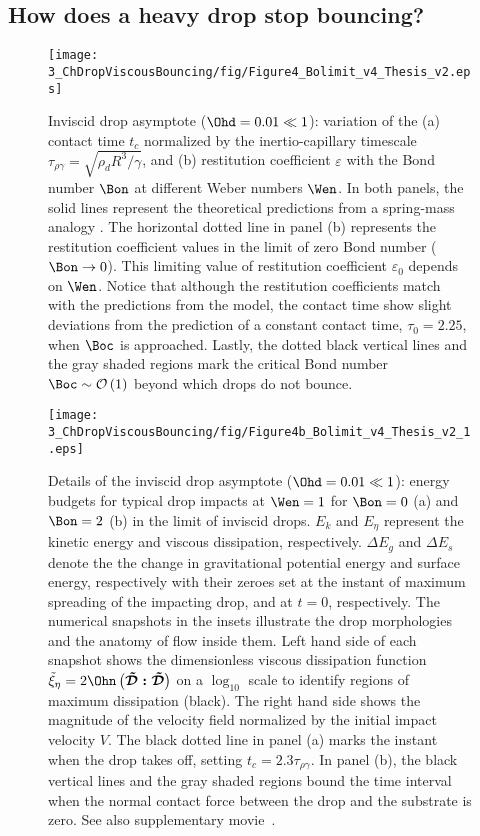 \subsection{How does a heavy drop stop bouncing?}\label{sec:LimitingCases:Bo}
\begin{figure}
	\centering
	\texttt{[image: 3\_ChDropViscousBouncing/fig/Figure4\_Bolimit\_v4\_Thesis\_v2.eps]}
	\caption{Inviscid drop asymptote ($\Ohd = 0.01 \ll 1$): variation of the (a) contact time $t_c$ normalized by the inertio-capillary timescale $\tau_{\rho\gamma} = \sqrt{\rho_dR^3/\gamma}$, and (b) restitution coefficient $\varepsilon$ with the Bond number $\Bon$ at different Weber numbers $\Wen$. In both panels, the solid lines represent the theoretical predictions from a spring-mass analogy \citep[equation~\ref{eqn:BianceEtAl_epsilon},][]{biance2006}. The horizontal dotted line in panel (b) represents the restitution coefficient values in the limit of zero Bond number ($\Bon \to 0$). This limiting value of restitution coefficient $\varepsilon_0$ depends on $\Wen$. Notice that although the restitution coefficients match with the predictions from the model, the contact time show slight deviations from the prediction of a constant contact time, $\tau_0 = 2.25$, when $\Boc$ is approached. Lastly, the dotted black vertical lines and the gray shaded regions mark the critical Bond number $\Boc \sim \mathcal{O}\left(1\right)$ beyond which drops do not bounce.}
	\label{fig:Bolim}
\end{figure}
\begin{figure}
	\centering
	\texttt{[image: 3\_ChDropViscousBouncing/fig/Figure4b\_Bolimit\_v4\_Thesis\_v2\_1.eps]}
	\caption{Details of the inviscid drop asymptote ($\Ohd = 0.01 \ll 1$): energy budgets for typical drop impacts at $\Wen = 1$ for $\Bon = 0$ (a) and $\Bon = 2$ (b) in the limit of inviscid drops. $E_k$ and $E_\eta$ represent the kinetic energy and viscous dissipation, respectively. $\Delta E_g$ and $\Delta E_s$ denote the the change in gravitational potential energy and surface energy, respectively with their zeroes set at the instant of maximum spreading of the impacting drop, and at $t = 0$, respectively. The numerical snapshots in the insets illustrate the drop morphologies and the anatomy of flow inside them. Left hand side of each snapshot shows the dimensionless viscous dissipation function $\tilde{\xi}_\eta = 2\Ohn\left(\boldsymbol{\tilde{\mathcal{D}}:\tilde{\mathcal{D}}}\right)$ on a $\log_{10}$ scale to identify regions of maximum dissipation (black). The right hand side shows the magnitude of the velocity field normalized by the initial impact velocity $V$. The black dotted line in panel (a) marks the instant when the drop takes off, setting $t_c = 2.3\tau_{\rho\gamma}$. In panel (b), the black vertical lines and the gray shaded regions bound the time interval when the normal contact force between the drop and the substrate is zero. See also supplementary movie~.}
	\label{fig:BolimDescription}
\end{figure}
